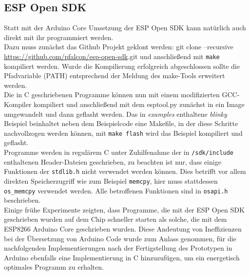 \subsection{ESP Open SDK}
Statt mit der Arduino Core Umsetzung der ESP Open SDK kann natürlich auch direkt mit ihr programmiert werden. \\
Dazu muss zunächst das Github Projekt geklont werden: git clone --recursive \url{https://github.com/pfalcon/esp-open-sdk}.git und anschließend mit \texttt{make} kompiliert werden.
Wurde die Kompilierung erfolgreich abgeschlossen sollte die Pfadvariable (PATH) entsprechend der Meldung des make-Tools erweitert werden. \\
Die in C geschriebenen Programme können nun mit einem modifizierten GCC-Kompiler kompiliert und anschließend mit dem esptool.py zunächst in ein Image umgewandelt und dann geflasht werden. 
Das in \textit{examples} enthaltene \textit{blinky} Beispiel beinhaltet neben dem Beispielcode eine Makefile, in der diese Schritte nachvollzogen werden können, mit \texttt{make flash} wird das Beispiel kompiliert und geflasht. \\
Programme werden in regulärem C unter Zuhilfenahme der in \texttt{/sdk/include} enthaltenen Header-Dateien geschrieben, zu beachten ist nur, dass einige Funktionen der \texttt{stdlib.h} nicht verwendet werden können.
Dies betrifft vor allem direkten Speicherzugriff wie zum Beispiel \texttt{memcpy}, hier muss stattdessen \texttt{os\_memcpy} verwendet werden.
Alle betroffenen Funktionen sind in \texttt{osapi.h} beschrieben. \\
Einige frühe Experimente zeigten, dass Programme, die mit der ESP Open SDK geschrieben wurden auf dem Chip schneller starten als solche, die mit dem ESP8266 Arduino Core geschrieben wurden.
Diese Andeutung von Ineffizienzen bei der Übersetzung von Arduino Code wurde zum Anlass genommen, für die nachfolgenden Implementierungen nach der Fertigstellung des Prototypen in Arduino ebenfalls eine Implementierung in C hinzuzufügen, um ein energetisch optimales Programm zu erhalten.



